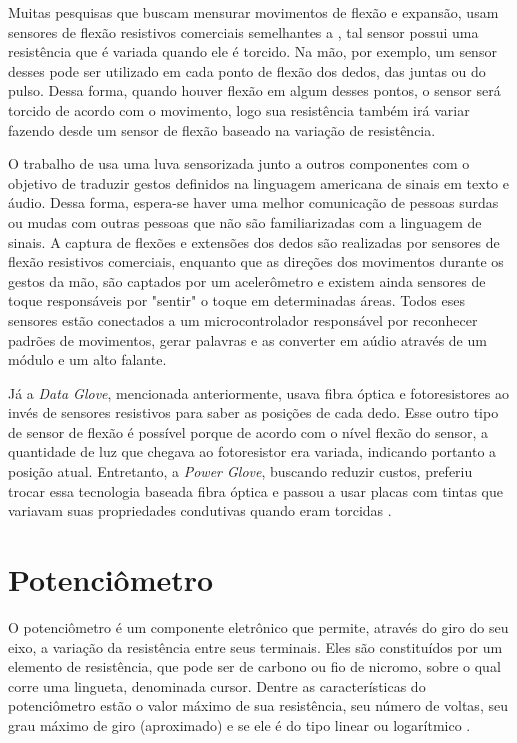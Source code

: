 \documentclass[
	12pt,				%
	openright,			%
	oneside,			%
	a4paper,			%
	english,			%
	brazil				%
	]{abntex2}
\begin{document}
		Muitas pesquisas que buscam mensurar movimentos de flexão e expansão, usam sensores de flexão resistivos comerciais semelhantes a \cite{flexsensor}, tal sensor possui uma resistência que é variada quando ele é torcido. Na mão, por exemplo, um sensor desses pode ser utilizado em cada ponto de flexão dos dedos, das juntas ou do pulso. Dessa forma, quando houver flexão em algum desses pontos, o sensor será torcido de acordo com o movimento, logo sua resistência também irá variar fazendo desde um sensor de flexão baseado na variação de resistência. 
		
		O trabalho de \cite{anbarasi2013deafmute} usa uma luva sensorizada junto a outros componentes com o objetivo de traduzir gestos definidos na linguagem americana de sinais em texto e áudio. Dessa forma, espera-se haver uma melhor comunicação de pessoas surdas ou mudas com outras pessoas que não são familiarizadas com a linguagem de sinais. A captura de flexões e extensões dos dedos são realizadas por sensores de flexão resistivos comerciais, enquanto que as direções dos movimentos durante os gestos da mão, são captados por um acelerômetro e existem ainda sensores de toque responsáveis por "sentir" o toque em determinadas áreas. Todos eses sensores estão conectados a um microcontrolador responsável por reconhecer padrões de movimentos, gerar palavras e as converter em aúdio através de um módulo e um alto falante. 

		Já a \textit{Data Glove}, mencionada anteriormente, usava fibra óptica e fotoresistores ao invés de sensores resistivos para saber as posições de cada dedo. Esse outro tipo de sensor de flexão é possível porque de acordo com o nível flexão do sensor, a quantidade de luz que chegava ao fotoresistor era variada, indicando portanto a posição atual. Entretanto, a \textit{Power Glove}, buscando reduzir custos, preferiu trocar essa tecnologia baseada fibra óptica e passou a usar placas com tintas que variavam suas propriedades condutivas quando eram torcidas \cite{dana1989powerglove}. 





		\section{Potenciômetro}
		O potenciômetro é um componente eletrônico que permite, através do giro do seu eixo, a variação da resistência entre seus terminais. Eles são constituídos por um elemento de resistência, que pode ser de carbono ou fio de nicromo, sobre o qual corre uma lingueta, denominada cursor. Dentre as características do potenciômetro estão o valor máximo de sua resistência, seu número de voltas, seu grau máximo de giro (aproximado) e se ele é do tipo linear ou logarítmico \cite{ncb2012eletronicabasica}.
\end{document}
